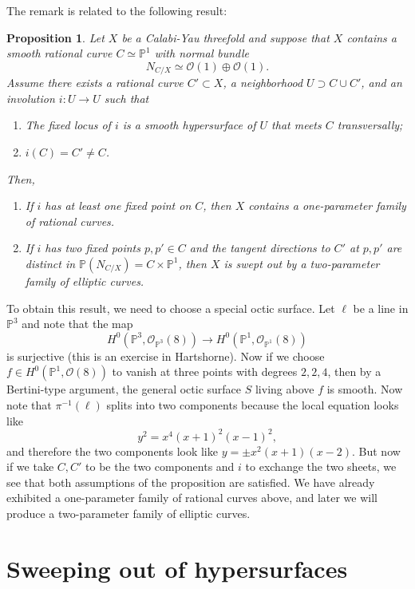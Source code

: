 \documentclass{amsart}
\newtheorem{prop}[thm]{Proposition}
\theoremstyle{definition}
\theoremstyle{remark}
\theoremstyle{plain}
\theoremstyle{definition}
\theoremstyle{remark}
\renewcommand{\P}{\mathbb{P}}
\newcommand{\mc}[1]{\mathcal{#1}}
\newcommand{\1}{\mathbf{1}}
\newcommand{\2}{\mathbf{2}}
\newcommand{\3}{\mathbf{3}}
\begin{document}
The remark is related to the following result:

\begin{prop}
    Let $X$ be a Calabi-Yau threefold and suppose that $X$ contains a smooth rational curve $C \simeq \P^1$ with normal bundle 
    \[ N_{C/X} \simeq \mc{O}(1) \oplus \mc{O}(1). \]
    Assume there exists a rational curve $C' \subset X$, a neighborhood $U \supset C \cup C'$, and an involution $i \colon U \to U$ such that
    \begin{enumerate}
        \item The fixed locus of $i$ is a smooth hypersurface of $U$ that meets $C$ transversally;
        \item $i(C) = C' \neq C$.
    \end{enumerate}
    Then,
    \begin{enumerate}
        \item If $i$ has at least one fixed point on $C$, then $X$ contains a one-parameter family of rational curves.
        \item If $i$ has two fixed points $p, p' \in C$ and the tangent directions to $C'$ at $p, p'$ are distinct in $\P(N_{C/X}) = C \times \P^1$, then $X$ is swept out by a two-parameter family of elliptic curves.
    \end{enumerate}
\end{prop}

To obtain this result, we need to choose a special octic surface. Let $\ell$ be a line in $\P^3$ and note that the map
\[ H^0(\P^3, \mc{O}_{\P^3}(8)) \to H^0(\P^1, \mc{O}_{\P^1}(8)) \]
is surjective (this is an exercise in Hartshorne). Now if we choose $f \in H^0(\P^1, \mc{O}(8))$ to vanish at three points with degrees $2,2,4$, then by a Bertini-type argument, the general octic surface $S$ living above $f$ is smooth. Now note that $\pi^{-1}(\ell)$ splits into two components because the local equation looks like
\[ y^2 = x^4 (x+1)^2 (x-1)^2, \]
and therefore the two components look like $y = \pm x^2 (x+1)(x-2)$. But now if we take $C, C'$ to be the two components and $i$ to exchange the two sheets, we see that both assumptions of the proposition are satisfied. We have already exhibited a one-parameter family of rational curves above, and later we will produce a two-parameter family  of elliptic curves.

\section{Sweeping out of hypersurfaces}
\end{document}
